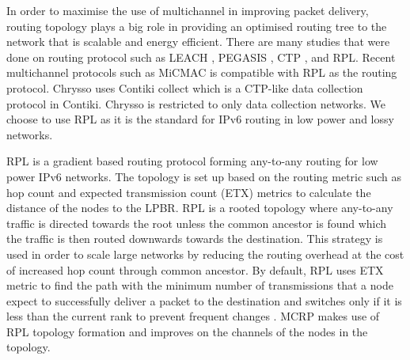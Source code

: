 In order to maximise the use of multichannel in improving packet delivery, routing topology plays a big role in providing an optimised routing tree to the network that is scalable and energy efficient. There are many studies that were done on routing protocol such as LEACH \cite{leach}, PEGASIS \cite{pegasis}, CTP \cite{ctp}, and RPL. Recent multichannel protocols such as MiCMAC is compatible with RPL as the routing protocol. Chrysso uses Contiki collect which is a CTP-like data collection protocol in Contiki. Chrysso is restricted to only data collection networks. We choose to use RPL as it is the standard for IPv6 routing in low power and lossy networks.

RPL \cite{winter2012rpl} is a gradient based routing protocol forming any-to-any routing for low power IPv6 networks. The topology is set up based on the routing metric \cite{routingmetrics} such as hop count and expected transmission count (ETX) metrics to calculate the distance of the nodes to the LPBR. RPL is a rooted topology where any-to-any traffic is directed towards the root unless the common ancestor is found which the traffic is then routed downwards towards the destination. This strategy is used in order to scale large networks by reducing the routing overhead at the cost of increased hop count through common ancestor. By default, RPL uses ETX metric to find the path with the minimum number of transmissions that a node expect to successfully deliver a packet to the destination and switches only if it is less than the current rank to prevent frequent changes \cite{mrhof}. MCRP makes use of RPL topology formation and improves on the channels of the nodes in the topology.